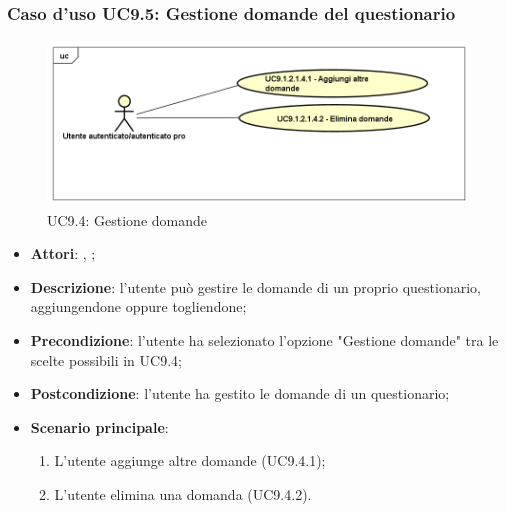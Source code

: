 	 \subsubsection{Caso d'uso UC9.5: Gestione domande del questionario}
	 \label{UC9.4}
	 \begin{figure}[h]
	 	\centering
	 	\includegraphics[scale=0.5,keepaspectratio]{UML/UC9_1_2_1_4.png}
	 	\caption{UC9.4: Gestione domande}
	 \end{figure}
	 \FloatBarrier
	 \begin{itemize}
	 	\item \textbf{Attori}: \uau, \uaupro;
	 	\item \textbf{Descrizione}: l'utente può gestire le domande di un proprio questionario, aggiungendone oppure togliendone;
	 	\item \textbf{Precondizione}: l'utente ha selezionato l'opzione "Gestione domande" tra le scelte possibili in UC9.4;
	 	\item \textbf{Postcondizione}: l'utente ha gestito le domande di un questionario;
	 	\item \textbf{Scenario principale}: 
	 	\begin{enumerate}
	 		\item L'utente aggiunge altre domande (UC9.4.1);
	 		\item L'utente elimina una domanda (UC9.4.2).
	 	\end{enumerate}
	 \end{itemize}
	 

